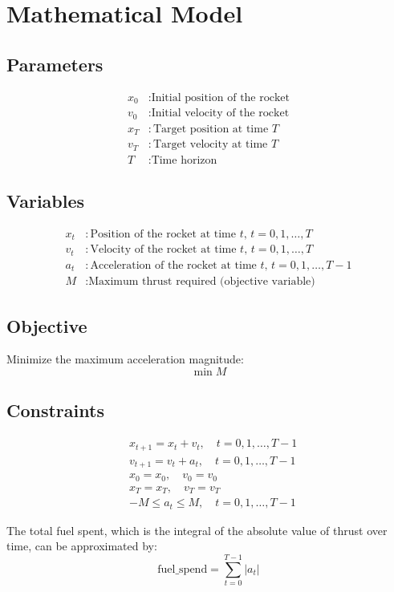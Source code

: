 \documentclass{article}
\begin{document}
\section*{Mathematical Model}

\subsection*{Parameters}
\begin{align*}
    x_0 & : \text{Initial position of the rocket} \\
    v_0 & : \text{Initial velocity of the rocket} \\
    x_T & : \text{Target position at time } T \\
    v_T & : \text{Target velocity at time } T \\
    T   & : \text{Time horizon} 
\end{align*}

\subsection*{Variables}
\begin{align*}
    x_t & : \text{Position of the rocket at time } t, \, t = 0, 1, \ldots, T \\
    v_t & : \text{Velocity of the rocket at time } t, \, t = 0, 1, \ldots, T \\
    a_t & : \text{Acceleration of the rocket at time } t, \, t = 0, 1, \ldots, T-1 \\
    M   & : \text{Maximum thrust required (objective variable)}
\end{align*}

\subsection*{Objective}
Minimize the maximum acceleration magnitude:
\[
\min M
\]

\subsection*{Constraints}
\begin{align}
    & x_{t+1} = x_t + v_t, \quad t = 0, 1, \ldots, T-1 \\
    & v_{t+1} = v_t + a_t, \quad t = 0, 1, \ldots, T-1 \\
    & x_0 = x_0, \quad v_0 = v_0 \\
    & x_T = x_T, \quad v_T = v_T \\
    & -M \leq a_t \leq M, \quad t = 0, 1, \ldots, T-1
\end{align}

The total fuel spent, which is the integral of the absolute value of thrust over time, can be approximated by:
\[
\text{fuel\_spend} = \sum_{t=0}^{T-1} |a_t|
\]
\end{document}
